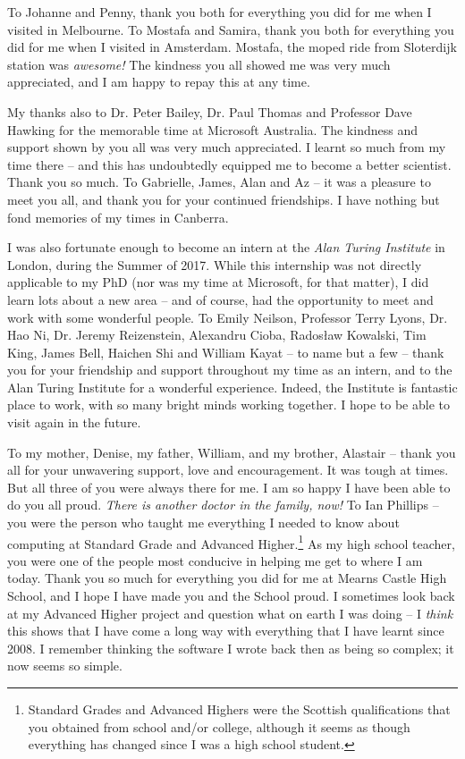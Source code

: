 \begin{preamble}
To Johanne and Penny, thank you both for everything you did for me when I visited in Melbourne. To Mostafa and Samira, thank you both for everything you did for me when I visited in Amsterdam. Mostafa, the moped ride from Sloterdijk station was \emph{awesome!} The kindness you all showed me was very much appreciated, and I am happy to repay this at any time.

My thanks also to Dr. Peter Bailey, Dr. Paul Thomas and Professor Dave Hawking for the memorable time at Microsoft Australia. The kindness and support shown by you all was very much appreciated. I learnt so much from my time there -- and this has undoubtedly equipped me to become a better scientist. Thank you so much. To Gabrielle, James, Alan and Az -- it was a pleasure to meet you all, and thank you for your continued friendships. I have nothing but fond memories of my times in Canberra.

I was also fortunate enough to become an intern at the \emph{Alan Turing Institute} in London, during the Summer of 2017. While this internship was not directly applicable to my PhD (nor was my time at Microsoft, for that matter), I did learn lots about a new area -- and of course, had the opportunity to meet and work with some wonderful people. To Emily Neilson, Professor Terry Lyons, Dr. Hao Ni, Dr. Jeremy Reizenstein, Alexandru Cioba, Rados\l{}aw Kowalski, Tim King, James Bell, Haichen Shi and William Kayat  -- to name but a few -- thank you for your friendship and support throughout my time as an intern, and to the Alan Turing Institute for a wonderful experience. Indeed, the Institute is fantastic place to work, with so many bright minds working together. I hope to be able to visit again in the future.

To my mother, Denise, my father, William, and my brother, Alastair -- thank you all for your unwavering support, love and encouragement. It was tough at times. But all three of you were always there for me. I am so happy I have been able to do you all proud. \emph{There is another doctor in the family, now!} To Ian Phillips -- you were the person who taught me everything I needed to know about computing at Standard Grade and Advanced Higher.\footnote{Standard Grades and Advanced Highers were the Scottish qualifications that you obtained from school and/or college, although it seems as though everything has changed since I was a high school student.} As my high school teacher, you were one of the people most conducive in helping me get to where I am today. Thank you so much for everything you did for me at Mearns Castle High School, and I hope I have made you and the School proud. I sometimes look back at my Advanced Higher project and question what on earth I was doing -- I \emph{think} this shows that I have come a long way with everything that I have learnt since 2008. I remember thinking the software I wrote back then as being so complex; it now seems so simple.


\end{preamble}
